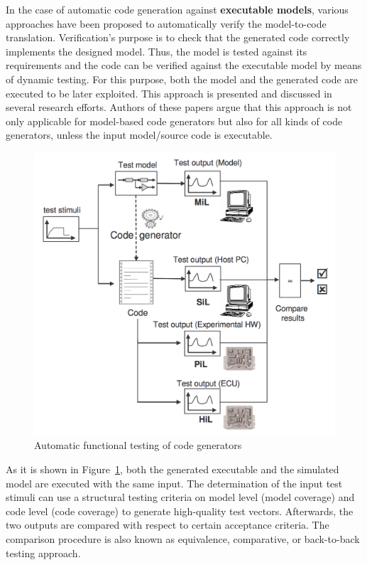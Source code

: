 In the case of automatic code generation against \textbf{executable models}, various approaches have been proposed to automatically verify the model-to-code translation. Verification's purpose is to check that the generated code correctly implements the designed model. Thus, the model is tested against its requirements and the code can be verified against the executable model by means of dynamic testing. For this purpose, both the model and the generated code are executed to be later exploited. This approach is presented and discussed in several research efforts\cite{sturmer2005overview,stuermer2007systematic,conrad2010code,jorges2014back,burnard2004verifying}. Authors of these papers argue that this approach is not only applicable for model-based code generators but also for all kinds of code generators, unless the input model/source code is executable.

\begin{figure}[h]
	\center
	\includegraphics[scale=0.6]{SOTA/fig/testing_process}
	\caption{Automatic functional testing of code generators}
	\label{fig:Process for testing automatically generated code}
\end{figure}

As it is shown in Figure~\ref{fig:Process for testing automatically generated code}, both the generated executable and the simulated model are executed with the same input. 
The determination of the input test stimuli can use a structural testing criteria on model level (model coverage) and code level (code coverage) to generate high-quality test vectors.
Afterwards, the two outputs are compared with respect
to certain acceptance criteria. The comparison procedure is also known as equivalence, comparative, or back-to-back testing approach\cite{vouk1990back,mckeeman1998differential}.
 
